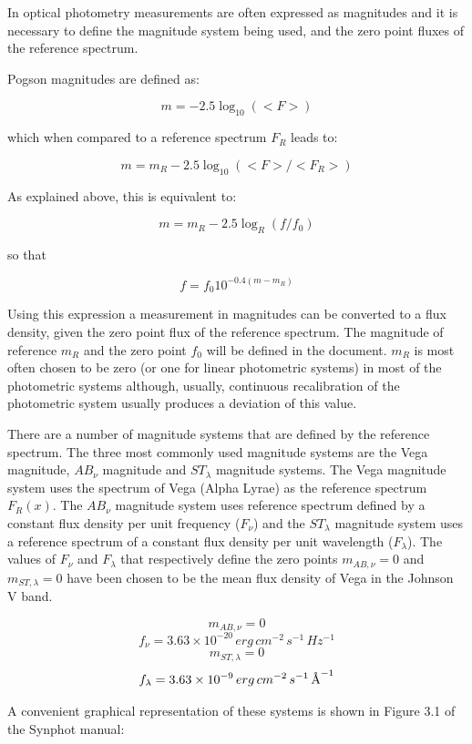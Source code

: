 \documentclass[11pt,a4paper]{ivoa}
\newcommand{\angstrom}{\mbox{\normalfont\AA}}
\begin{document}
In optical photometry measurements are often expressed as magnitudes and it is necessary to define the magnitude system being used, and the zero point fluxes of the reference spectrum.
\par

Pogson magnitudes are defined as:
\par
\[  m = -2.5\log_{10} (<F>) \]

which when compared to a reference spectrum $F_R$ leads to:
\par
\[  m = m_R -2.5 \log_{10} \left( <F>/<F_R >\right) \]

As explained above, this is equivalent to:
\par
\[ m = m_R - 2.5 \log_{R} (f/f_0 ) \]

so that
\par
\[ f = f_0 10^{-0.4(m - m_{R})} \]


Using this expression a measurement in magnitudes can be converted to a flux density, given the zero point flux of the reference spectrum.  The magnitude of reference $m_{R}$ and the zero point $f_0$ will be defined in the document. $m_{R}$ is most often chosen to be zero (or one for linear photometric systems) in most of the photometric systems although, usually, continuous recalibration of the photometric system usually produces a deviation of this value.
\par

There are a number of magnitude systems that are defined by the reference spectrum. The three most commonly used magnitude systems are the Vega magnitude, $AB_{\nu }$ magnitude and $ST_{\lambda }$ magnitude systems. The Vega magnitude system uses the spectrum of Vega (Alpha Lyrae) as the reference spectrum $F_R (x)$. The $AB_{\nu }$ magnitude system uses reference spectrum defined by a constant flux density per unit frequency ($F_{\nu }$) and the
$ST_{\lambda }$ magnitude system uses a reference spectrum of a constant flux density per unit wavelength ($F_{\lambda }$). The values of $F_{\nu }$ and $F_{\lambda }$ that respectively define the zero points
$m_{AB,\nu } =0$ and
$m_{ST,\lambda } =0$ have been chosen to be the mean flux density of Vega in the Johnson V band.
\par

\[
m_{AB,\nu } = 0
\]
\[
f_\nu = 3.63\times 10^{-20}\,erg\,cm^{-2}\,s^{-1}\,Hz^{-1}
\]
\[
m_{ST,\lambda } = 0
\]
\[
f_\lambda = 3.63\times 10^{-9}\,erg\,cm^{-2}\,s^{-1}\,\angstrom^{-1}
\]


A convenient graphical representation of these systems is shown in Figure 3.1 of the Synphot manual:
\end{document}
